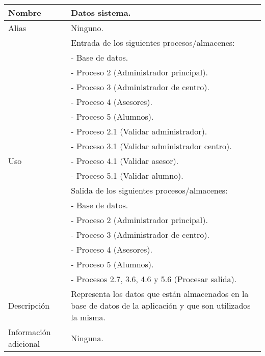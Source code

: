 \begin{center}
  \begin{tabular}{| l | p{9cm} |}
    \hline
    Nombre & \textbf{Datos sistema}.\\
    \hline
    Alias & Ninguno.\\
    \hline
    \multirow{17}{*}{Uso} & Entrada de los siguientes procesos/almacenes:\\
                         & - Base de datos.\\
                         & - Proceso 2 (Administrador principal).\\
                         & - Proceso 3 (Administrador de centro).\\
                         & - Proceso 4 (Asesores).\\
                         & - Proceso 5 (Alumnos).\\
                         & - Proceso 2.1 (Validar administrador).\\
                         & - Proceso 3.1 (Validar administrador centro).\\
                         & - Proceso 4.1 (Validar asesor).\\
                         & - Proceso 5.1 (Validar alumno).\\
                         & Salida de los siguientes procesos/almacenes:\\
                         & - Base de datos.\\
                         & - Proceso 2 (Administrador principal).\\
                         & - Proceso 3 (Administrador de centro).\\
                         & - Proceso 4 (Asesores).\\
                         & - Proceso 5 (Alumnos).\\
                         & - Procesos 2.7, 3.6, 4.6 y 5.6 (Procesar salida).\\
    \hline
    Descripción & Representa los datos que están almacenados en la base de datos
                  de la aplicación y que son utilizados la misma.\\
    \hline
    Información adicional & Ninguna.\\
    \hline
  \end{tabular}
\end{center}
